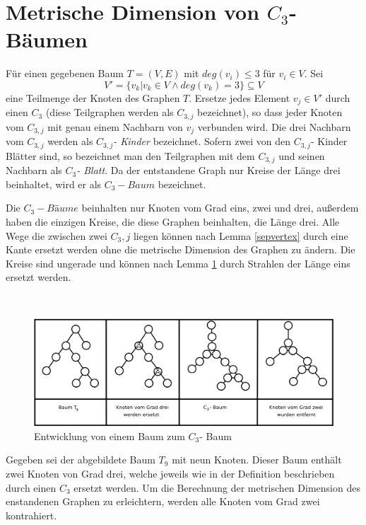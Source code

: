 \section{Metrische Dimension von $C_3$- Bäumen}
\begin{defi}
\label{C_{3} tree}
Für einen gegebenen Baum $T=(V,E)$ mit $deg(v_i)\leq 3$ für $v_i \in V$. Sei $$V'=\{v_k|v_k \in V \wedge deg(v_k)=3\}\subseteq V$$ eine Teilmenge der Knoten des Graphen $T$. Ersetze jedes Element $v_j \in V'$ durch einen $C_3$ (diese Teilgraphen werden als \emph{$C_{3,j}$} bezeichnet), so dass jeder Knoten vom $C_{3,j}$ mit genau einem Nachbarn von $v_j$ verbunden wird. Die drei Nachbarn vom $C_{3,j}$ werden als \emph{$C_{3,j}$- Kinder} bezeichnet. Sofern zwei von den $C_{3,j}$- Kinder Blätter sind, so bezeichnet man den Teilgraphen mit dem $C_{3,j}$ und seinen Nachbarn als \emph{$C_{3}$- Blatt}. Da der entstandene Graph nur Kreise der Länge drei beinhaltet, wird er als \emph{$C_3-Baum$} bezeichnet. 
   \end{defi}
   \begin{bem}
Die $C_3-Bäume$ beinhalten nur Knoten vom Grad eins, zwei und drei, außerdem haben die einzigen Kreise, die diese Graphen beinhalten, die Länge drei. Alle Wege die zwischen zwei $C_3,j$ liegen können nach Lemma \ref{sepvertex} durch eine Kante ersetzt werden ohne die metrische Dimension des Graphen zu ändern. Die Kreise  sind ungerade und können nach Lemma \ref{} durch Strahlen der Länge eins ersetzt werden.
\end{bem} 
\begin{bsp}~
\begin{figure}[h!]
		\centering 		 
   \includegraphics[width=350pt]{bilder/trees.pdf}
	\caption{Entwicklung von einem Baum zum $C_{3}$- Baum}
  	 \end{figure}
\end{bsp}
Gegeben sei der abgebildete Baum $T_9$ mit neun Knoten. Dieser Baum enthält zwei Knoten von Grad drei, welche jeweils wie in der Definition beschrieben durch einen $C_3$ ersetzt werden. Um die Berechnung der metrischen Dimension des enstandenen Graphen zu erleichtern, werden alle Knoten vom Grad zwei kontrahiert.
